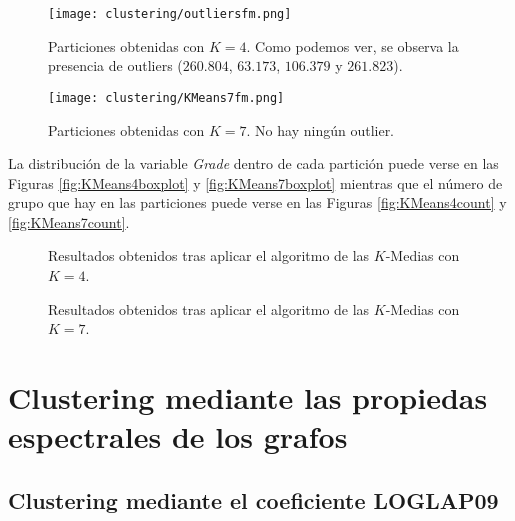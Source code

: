 \begin{figure}[H]
    \centering
    \texttt{[image: clustering/outliersfm.png]}
    \caption{Particiones obtenidas con $K = 4$. Como podemos ver, se observa la presencia de outliers ($260.804$, $63.173$, $106.379$ y $261.823$).}
    \label{fig:KMeans4}
\end{figure}

\begin{figure}[H]
    \centering
    \texttt{[image: clustering/KMeans7fm.png]}
    \caption{Particiones obtenidas con $K = 7$. No hay ningún outlier.}
    \label{fig:KMeans7}
\end{figure}

La distribución de la variable \emph{Grade} dentro de cada partición puede verse en las Figuras \ref{fig:KMeans4boxplot} y \ref{fig:KMeans7boxplot} mientras que el número de grupo que hay en las particiones puede verse en las Figuras \ref{fig:KMeans4count} y \ref{fig:KMeans7count}.

\begin{figure}[H]
\centering
{}\qquad
{}%
\caption{Resultados obtenidos tras aplicar el algoritmo de las $K$-Medias con $K = 4$.}
\label{fig:KMeans4details}
\end{figure}

\begin{figure}[H]
\centering
{}\qquad
{}%
\caption{Resultados obtenidos tras aplicar el algoritmo de las $K$-Medias con $K = 7$.}
\label{fig:KMeans7details}
\end{figure}

\section{Clustering mediante las propiedas espectrales de los grafos}
\subsection{Clustering mediante el coeficiente LOGLAP09}

